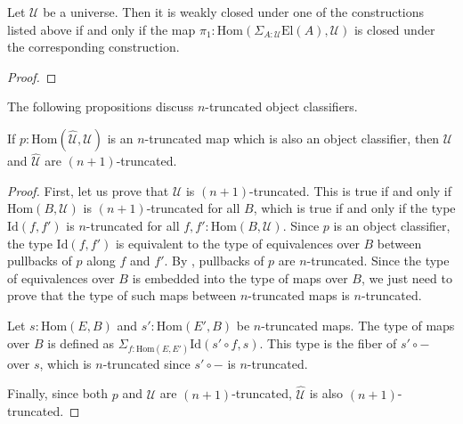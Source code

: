 \documentclass[reqno]{amsart}
\theoremstyle{definition}
\theoremstyle{remark}
\newcommand{\fs}[1]{\mathrm{#1}}
\newcommand{\Hom}{\fs{Hom}}
\newcommand{\Id}{\fs{Id}}
\newcommand{\El}{\fs{El}}
\numberwithin{figure}{section}
\begin{document}
\begin{prop}
Let $\mathcal{U}$ be a universe.
Then it is weakly closed under one of the constructions listed above if and only if the map $\pi_1 : \Hom(\Sigma_{A : \mathcal{U}} \El(A), \mathcal{U})$ is closed under the corresponding construction.
\end{prop}
\begin{proof}
\end{proof}

The following propositions discuss $n$-truncated object classifiers.

\begin{prop}
If $p : \Hom(\widehat{\mathcal{U}},\mathcal{U})$ is an $n$-truncated map which is also an object classifier, then $\mathcal{U}$ and $\widehat{\mathcal{U}}$ are $(n+1)$-truncated.
\end{prop}
\begin{proof}
First, let us prove that $\mathcal{U}$ is $(n+1)$-truncated.
This is true if and only if $\Hom(B,\mathcal{U})$ is $(n+1)$-truncated for all $B$, which is true if and only if the type $\Id(f,f')$ is $n$-truncated for all $f,f' : \Hom(B,\mathcal{U})$.
Since $p$ is an object classifier, the type $\Id(f,f')$ is equivalent to the type of equivalences over $B$ between pullbacks of $p$ along $f$ and $f'$.
By , pullbacks of $p$ are $n$-truncated.
Since the type of equivalences over $B$ is embedded into the type of maps over $B$, we just need to prove that the type of such maps between $n$-truncated maps is $n$-truncated.

Let $s : \Hom(E,B)$ and $s' : \Hom(E',B)$ be $n$-truncated maps.
The type of maps over $B$ is defined as $\Sigma_{f : \Hom(E,E')} \Id(s' \circ f, s)$.
This type is the fiber of $s' \circ -$ over $s$, which is $n$-truncated since $s' \circ -$ is $n$-truncated.

Finally, since both $p$ and $\mathcal{U}$ are $(n+1)$-truncated, $\widehat{\mathcal{U}}$ is also $(n+1)$-truncated.
\end{proof}
\end{document}
